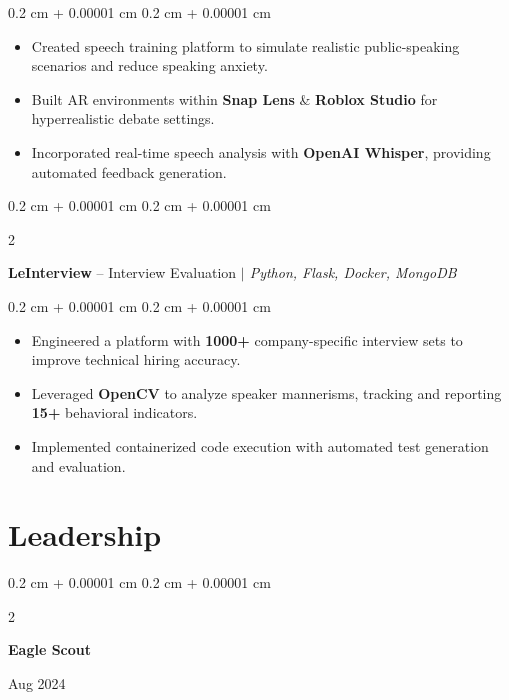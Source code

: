 \documentclass[10pt, letterpaper]{article}
\newenvironment{highlights}{
    \begin{itemize}[
        topsep=0.10 cm,
        parsep=0.10 cm,
        partopsep=0pt,
        itemsep=0pt,
        leftmargin=0.4 cm + 10pt
    ]
}{
    \end{itemize}
} %
\newenvironment{onecolentry}{
    \begin{adjustwidth}{
        0.2 cm + 0.00001 cm
    }{
        0.2 cm + 0.00001 cm
    }
}{
    \end{adjustwidth}
} %
\newenvironment{twocolentry}[2][]{
    \onecolentry
    \def\secondColumn{#2}
    \setcolumnwidth{\fill, 5 cm}
    \begin{paracol}{2}
}{
    \switchcolumn \raggedleft \secondColumn
    \end{paracol}
    \endonecolentry
} %
\let\hrefWithoutArrow\href
\renewcommand{\href}[2]{\hrefWithoutArrow{#1}{\ifthenelse{\equal{#2}{}}{ }{#2 }\raisebox{.15ex}{\footnotesize \faExternalLink*}}}
\begin{document}
        \vspace{0.10 cm}
        \begin{onecolentry}
            \begin{highlights}
                \item Created speech training platform to simulate realistic public-speaking scenarios and reduce speaking anxiety.
                \item Built AR environments within \textbf{Snap Lens} \& \textbf{Roblox Studio} for hyperrealistic debate settings.
                \item Incorporated real-time speech analysis with \textbf{OpenAI Whisper}, providing automated feedback generation.
            \end{highlights}
        \end{onecolentry}


        \vspace{0.3 cm}

        \begin{twocolentry}{}
            \textbf{LeInterview} -- Interview Evaluation \textit{ $|$ Python, Flask, Docker, MongoDB}
        \end{twocolentry}

        \vspace{0.10 cm}
        \begin{onecolentry}
            \begin{highlights}
                \item Engineered a platform with \textbf{1000+} company-specific interview sets to improve technical hiring accuracy.
                \item Leveraged \textbf{OpenCV} to analyze speaker mannerisms, tracking and reporting \textbf{15+} behavioral indicators.
                \item Implemented containerized code execution with automated test generation and evaluation.
            \end{highlights}
        \end{onecolentry}


    \section{Leadership}

        \begin{twocolentry}{
        Aug 2024}
            \textbf{Eagle Scout}
        \end{twocolentry}
\end{document}
